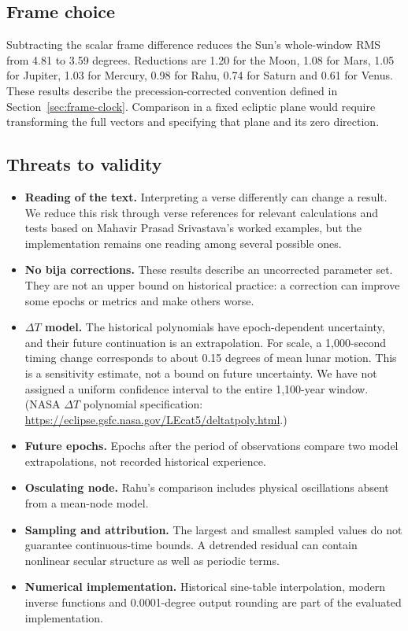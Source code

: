 \documentclass[11pt,a4paper]{article}
\newcommand{\dT}{$\Delta T$}
\begin{document}
\subsection{Frame choice}

Subtracting the scalar frame difference reduces the Sun's whole-window RMS from 4.81 to 3.59 degrees. Reductions are 1.20 for the Moon, 1.08 for Mars, 1.05 for Jupiter, 1.03 for Mercury, 0.98 for Rahu, 0.74 for Saturn and 0.61 for Venus. These results describe the precession-corrected convention defined in Section~\ref{sec:frame-clock}. Comparison in a fixed ecliptic plane would require transforming the full vectors and specifying that plane and its zero direction.

\subsection{Threats to validity}
\label{sec:threats}

\begin{itemize}
  \item \textbf{Reading of the text.} Interpreting a verse differently can change a result. We reduce this risk through verse references for relevant calculations and tests based on Mahavir Prasad Srivastava's worked examples, but the implementation remains one reading among several possible ones.
  \item \textbf{No bija corrections.} These results describe an uncorrected parameter set. They are not an upper bound on historical practice: a correction can improve some epochs or metrics and make others worse.
  \item \textbf{\dT{} model.} The historical polynomials have epoch-dependent uncertainty, and their future continuation is an extrapolation. For scale, a 1,000-second timing change corresponds to about 0.15 degrees of mean lunar motion. This is a sensitivity estimate, not a bound on future uncertainty. We have not assigned a uniform confidence interval to the entire 1,100-year window. (NASA \dT{} polynomial specification: \url{https://eclipse.gsfc.nasa.gov/LEcat5/deltatpoly.html}.)
  \item \textbf{Future epochs.} Epochs after the period of observations compare two model extrapolations, not recorded historical experience.
  \item \textbf{Osculating node.} Rahu's comparison includes physical oscillations absent from a mean-node model.
  \item \textbf{Sampling and attribution.} The largest and smallest sampled values do not guarantee continuous-time bounds. A detrended residual can contain nonlinear secular structure as well as periodic terms.
  \item \textbf{Numerical implementation.} Historical sine-table interpolation, modern inverse functions and 0.0001-degree output rounding are part of the evaluated implementation.
\end{itemize}
\end{document}
